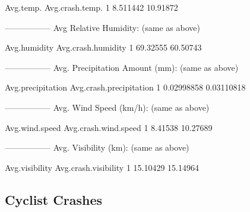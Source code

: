 \documentclass[11pt, a4paper]{article}
\begin{document}
\begin{Schunk}
\begin{Soutput}
\end{Soutput}
\begin{Soutput}
  Avg.temp. Avg.crash.temp.
1  8.511442        10.91872
\end{Soutput}
\begin{Soutput}
-----------------
Avg Relative Humidity: (same as above)
\end{Soutput}
\begin{Soutput}
  Avg.humidity Avg.crash.humidity
1     69.32555           60.50743
\end{Soutput}
\begin{Soutput}
-----------------
Avg. Precipitation Amount (mm): (same as above)
\end{Soutput}
\begin{Soutput}
  Avg.precipitation Avg.crash.precipitation
1        0.02998858              0.03110818
\end{Soutput}
\begin{Soutput}
-----------------
Avg. Wind Speed (km/h): (same as above)
\end{Soutput}
\begin{Soutput}
  Avg.wind.speed Avg.crash.wind.speed
1        8.41538             10.27689
\end{Soutput}
\begin{Soutput}
-----------------
Avg. Visibility (km): (same as above)
\end{Soutput}
\begin{Soutput}
  Avg.visibility Avg.crash.visibility
1       15.10429             15.14964
\end{Soutput}
\end{Schunk}




\pagebreak
\subsection{Cyclist Crashes}
\end{document}
